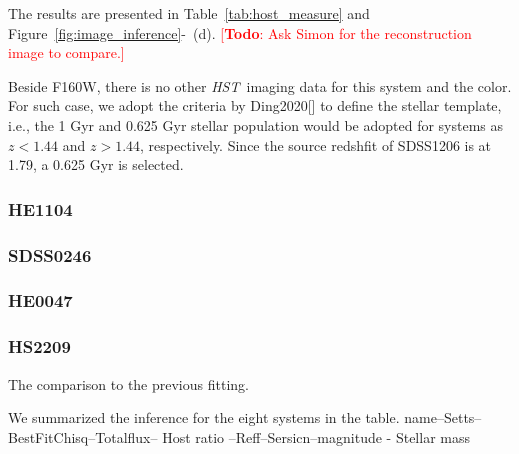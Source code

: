 \documentclass[fleqn,usenatbib]{mnras}
\newcommand{\hst}{{\it HST}}
\newcommand{\todo}[1]{\textcolor{red}{[{\bf Todo}: #1]}}
\begin{document}
The results are presented in Table~\ref{tab:host_measure} and Figure~\ref{fig:image_inference}-~(d).
\todo{Ask Simon for the reconstruction image to compare.}

Beside F160W, there is no other \hst\ imaging data for this system and the color. For such case, we adopt the criteria by Ding2020[] to define the stellar template, i.e., the 1 Gyr and 0.625 Gyr stellar population would be adopted for systems as $z<1.44$ and $z>1.44$, respectively. Since the source redshfit of SDSS1206 is at 1.79, a 0.625 Gyr is selected.

\subsubsection{HE1104}

\subsubsection{SDSS0246}

\subsubsection{HE0047}

\subsubsection{HS2209}

The comparison to the previous fitting.

We summarized the inference for the eight systems in the table.
name--Setts--BestFitChisq--Totalflux-- Host ratio --Reff--Sersicn--magnitude - Stellar mass
\end{document}
